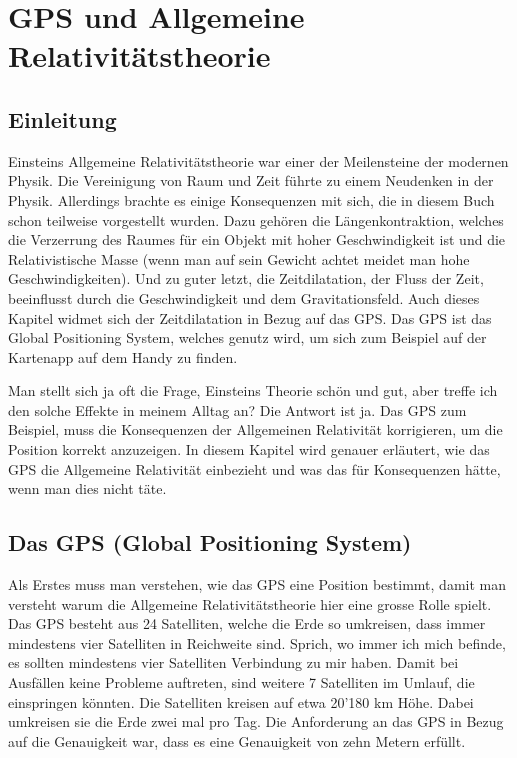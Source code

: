 
\chapter{GPS und Allgemeine Relativitätstheorie\label{chapter:thema}}
\begin{refsection}

\section{Einleitung}
Einsteins Allgemeine Relativitätstheorie war einer der Meilensteine der modernen Physik. Die Vereinigung von Raum und Zeit führte zu einem Neudenken in der Physik. Allerdings brachte es einige Konsequenzen mit sich, die in diesem Buch schon teilweise vorgestellt wurden. Dazu gehören die Längenkontraktion, welches die Verzerrung des Raumes für ein Objekt mit hoher Geschwindigkeit ist und die Relativistische Masse (wenn man auf sein Gewicht achtet meidet man hohe Geschwindigkeiten). Und zu guter letzt, die Zeitdilatation, der Fluss der Zeit, beeinflusst durch die Geschwindigkeit und dem Gravitationsfeld. Auch dieses Kapitel widmet sich der Zeitdilatation in Bezug auf das GPS. Das GPS ist das Global Positioning System, welches genutz wird, um sich zum Beispiel auf der Kartenapp auf dem Handy zu finden.

Man stellt sich ja oft die Frage, Einsteins Theorie schön und gut, aber treffe ich den solche Effekte in meinem Alltag an? Die Antwort ist ja. Das GPS zum Beispiel, muss die Konsequenzen der Allgemeinen Relativität korrigieren, um die Position korrekt anzuzeigen. In diesem Kapitel wird genauer erläutert, wie das GPS die Allgemeine Relativität einbezieht und was das für Konsequenzen hätte, wenn man dies nicht täte.

\section{Das GPS (Global Positioning System)}
Als Erstes muss man verstehen, wie das GPS eine Position bestimmt, damit man versteht warum die Allgemeine Relativitätstheorie hier eine grosse Rolle spielt. Das GPS besteht aus 24 Satelliten, welche die Erde so umkreisen, dass immer mindestens vier Satelliten in Reichweite sind. Sprich, wo immer ich mich befinde, es sollten mindestens vier Satelliten Verbindung zu mir haben. Damit bei Ausfällen keine Probleme auftreten, sind weitere 7 Satelliten im Umlauf, die einspringen könnten. Die Satelliten kreisen auf etwa 20'180 km Höhe. Dabei umkreisen sie die Erde zwei mal pro Tag. Die Anforderung an das GPS in Bezug auf die Genauigkeit war, dass es eine Genauigkeit von zehn Metern erfüllt. 


\end{refsection}
